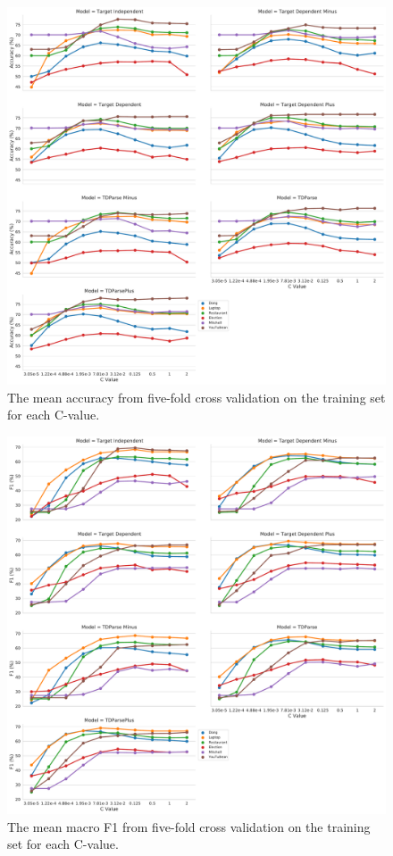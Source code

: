 \begin{figure}[!h]
    \centering
    \includegraphics[scale=0.35]{images/reproducibility/Parameters/C_Value/C_Accuracy_Plot.pdf}
    \caption{The mean accuracy from five-fold cross validation on the training set for each C-value.}
    \label{fig:repro_parameters_c_accuracy_plot}
\end{figure}

\begin{figure}[!h]
    \centering
    \includegraphics[scale=0.35]{images/reproducibility/Parameters/C_Value/C_F1_Plot.pdf}
    \caption{The mean macro F1 from five-fold cross validation on the training set for each C-value.}
    \label{fig:repro_parameters_c_macro_f1_plot}
\end{figure}


